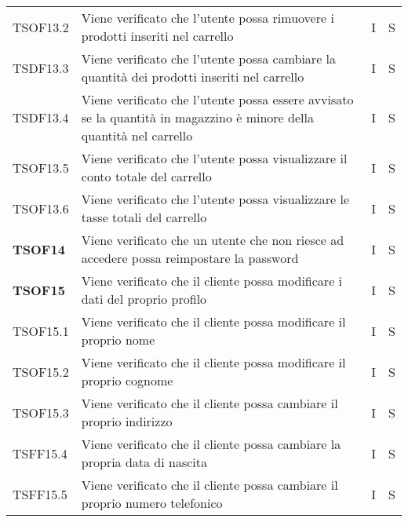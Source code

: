 \begin{center}
\begin{longtable}[!h]{p{60px} p{240px} p{35px} p{35px}}
        TSOF13.2        & Viene verificato che l'utente possa rimuovere i prodotti inseriti nel carrello                                      & I              & S              \\
        TSDF13.3        & Viene verificato che l'utente possa cambiare la quantità dei prodotti inseriti nel carrello                         & I              & S              \\
        TSDF13.4        & Viene verificato che l'utente possa essere avvisato se la quantità in magazzino è minore della quantità nel carrello      & I              & S              \\
        TSOF13.5        & Viene verificato che l'utente possa visualizzare il conto totale del carrello                                       & I              & S              \\
        TSOF13.6        & Viene verificato che l'utente possa visualizzare le tasse totali del carrello                                       & I              & S              \\
        \textbf{TSOF14} & Viene verificato che un utente che non riesce ad accedere possa reimpostare la password                             & I              & S              \\
        \textbf{TSOF15} & Viene verificato che il cliente possa modificare i dati del proprio profilo                                         & I              & S              \\
        TSOF15.1        & Viene verificato che il cliente possa modificare il proprio nome                                                    & I              & S              \\
        TSOF15.2        & Viene verificato che il cliente possa modificare il proprio cognome                                                 & I              & S              \\
        TSOF15.3        & Viene verificato che il cliente possa cambiare il proprio indirizzo                                                 & I              & S              \\
        TSFF15.4        & Viene verificato che il cliente possa cambiare la propria data di nascita                                           & I              & S              \\
        TSFF15.5        & Viene verificato che il cliente possa cambiare il proprio numero telefonico                                         & I              & S              \\

\end{longtable}
\end{center}

